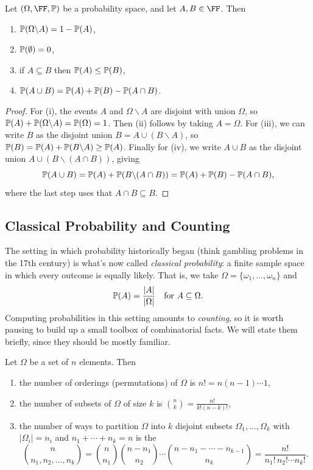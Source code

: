 \documentclass[a4paper]{scrartcl}
\begin{document}
\begin{proposition}
	Let $(\Omega, \FF, \PP)$ be a probability space, and let $A, B \in \FF$. Then
	\begin{enumerate}[label=(\roman*)]
		\item $\mathbb{P}(\Omega \backslash A) = 1 - \mathbb{P}(A)$,
		\item $\mathbb{P}(\emptyset) = 0$,
		\item if $A \subseteq B$ then $\mathbb{P}(A) \leq \mathbb{P}(B)$,
		\item $\mathbb{P}(A \cup B) = \mathbb{P}(A) + \mathbb{P}(B) - \mathbb{P}(A \cap B)$.
	\end{enumerate}
\end{proposition}
\begin{proof}
	For (i), the events $A$ and $\Omega \backslash A$ are disjoint with union $\Omega$, so $\mathbb{P}(A) + \mathbb{P}(\Omega \backslash A) = \mathbb{P}(\Omega) = 1$. Then (ii) follows by taking $A = \Omega$. For (iii), we can write $B$ as the disjoint union $B = A \cup (B \backslash A)$, so $\mathbb{P}(B) = \mathbb{P}(A) + \mathbb{P}(B \backslash A) \geq \mathbb{P}(A)$. Finally for (iv), we write $A \cup B$ as the disjoint union $A \cup (B \backslash (A \cap B))$, giving
	$$
	\mathbb{P}(A \cup B) = \mathbb{P}(A) + \mathbb{P}(B \backslash (A \cap B)) = \mathbb{P}(A) + \mathbb{P}(B) - \mathbb{P}(A \cap B),
	$$
	where the last step uses that $A \cap B \subseteq B$.
\end{proof}

\subsection{Classical Probability and Counting}

The setting in which probability historically began (think gambling problems in the 17th century) is what's now called \emph{classical probability}: a finite sample space in which every outcome is equally likely. That is, we take $\Omega = \{\omega_1, \dots, \omega_n\}$ and
$$
\mathbb{P}(A) = \frac{|A|}{|\Omega|} \quad \text{for } A \subseteq \Omega.
$$
Computing probabilities in this setting amounts to \emph{counting}, so it is worth pausing to build up a small toolbox of combinatorial facts. We will state them briefly, since they should be mostly familiar.

\begin{fact}
	Let $\Omega$ be a set of $n$ elements. Then
	\begin{enumerate}[label=(\roman*)]
		\item the number of orderings (permutations) of $\Omega$ is $n! = n(n-1) \cdots 1$,
		\item the number of subsets of $\Omega$ of size $k$ is $\binom{n}{k} = \frac{n!}{k!(n - k)!}$,
		\item the number of ways to partition $\Omega$ into $k$ disjoint subsets $\Omega_1, \dots, \Omega_k$ with $|\Omega_i| = n_i$ and $n_1 + \cdots + n_k = n$ is the 
		$$
		\binom{n}{n_1, n_2, \dots, n_k} = \binom{n}{n_1}\binom{n - n_1}{n_2} \cdots \binom{n - n_1 - \cdots - n_{k - 1}}{n_k} = \frac{n!}{n_1! \, n_2! \cdots n_k!}.
		$$
	\end{enumerate}
\end{fact}
\end{document}
